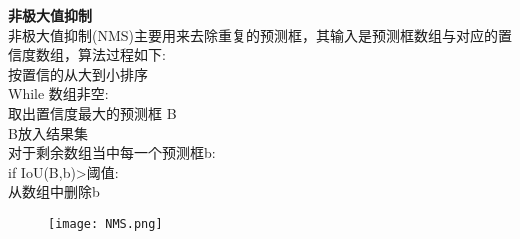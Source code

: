 \begin{frame}
    \vspace{0.5em}
    \noindent\large\textbf{非极大值抑制}\\
    \vspace{0.5em}
    非极大值抑制(NMS)主要用来去除重复的预测框，其输入是预测框数组与对应的置信度数组，算法过程如下:\\
    \vspace{0.5em}
    按置信的从大到小排序\\
    While 数组非空:\\
    \qquad 取出置信度最大的预测框 B\\
    \qquad B放入结果集\\
    \qquad 对于剩余数组当中每一个预测框b:\\
    \qquad \qquad if IoU(B,b)>阈值:\\
    \qquad \qquad \qquad 从数组中删除b\\

    \begin{figure}
        \texttt{[image: NMS.png]}
    \end{figure}

\end{frame}

